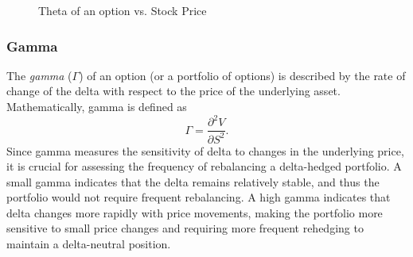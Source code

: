\begin{figure}[H]
    \centering
    \caption{Theta of an option vs. Stock Price}
    \label{fig:theta-plot}
\end{figure}

\subsubsection{Gamma}
The \textit{gamma} ($\Gamma$) of an option (or a portfolio of options) is described by the rate of change of the delta with respect to the price of the underlying asset. Mathematically, gamma is defined as
\begin{equation}
    \Gamma = \frac{\partial^2 V}{\partial S^2}.
\end{equation}
Since gamma measures the sensitivity of delta to changes in the underlying price, it is crucial for assessing the frequency of rebalancing a delta-hedged portfolio. A small gamma indicates
that the delta remains relatively stable, and thus the portfolio would not require frequent rebalancing. A high gamma indicates that delta changes more rapidly with price movements, making the portfolio more sensitive to small price changes and requiring more frequent rehedging to maintain a delta-neutral position.

